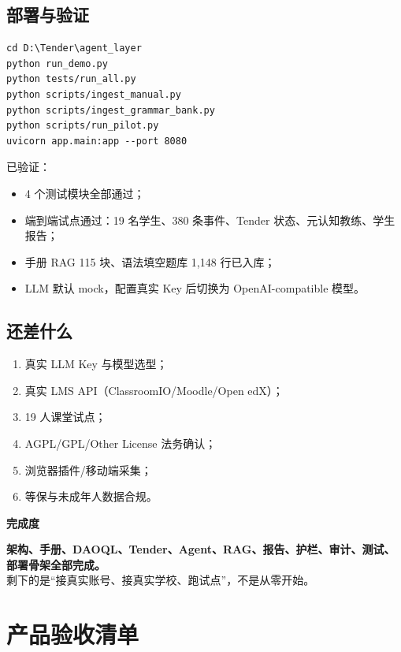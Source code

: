 \documentclass[UTF8,a4paper,11pt]{ctexart}
\newenvironment{explainbox}[1]
{\begin{center}\begin{minipage}{0.94\textwidth}\colorbox{boxbg}{\parbox{0.92\textwidth}{\textbf{#1}\par\vspace{2pt}}}}
{\end{minipage}\end{center}}
\begin{document}
\subsection{部署与验证}

\begin{verbatim}
cd D:\Tender\agent_layer
python run_demo.py
python tests/run_all.py
python scripts/ingest_manual.py
python scripts/ingest_grammar_bank.py
python scripts/run_pilot.py
uvicorn app.main:app --port 8080
\end{verbatim}

已验证：

\begin{itemize}[leftmargin=2em]
\item 4 个测试模块全部通过；
\item 端到端试点通过：19 名学生、380 条事件、Tender 状态、元认知教练、学生报告；
\item 手册 RAG 115 块、语法填空题库 1{,}148 行已入库；
\item LLM 默认 mock，配置真实 Key 后切换为 OpenAI-compatible 模型。
\end{itemize}

\subsection{还差什么}

\begin{enumerate}[leftmargin=2em]
\item 真实 LLM Key 与模型选型；
\item 真实 LMS API（ClassroomIO/Moodle/Open edX）；
\item 19 人课堂试点；
\item AGPL/GPL/Other License 法务确认；
\item 浏览器插件/移动端采集；
\item 等保与未成年人数据合规。
\end{enumerate}

\begin{explainbox}{完成度}
\textbf{架构、手册、DAOQL、Tender、Agent、RAG、报告、护栏、审计、测试、部署骨架全部完成。}\\
剩下的是“接真实账号、接真实学校、跑试点”，不是从零开始。
\end{explainbox}


\section{产品验收清单}
\end{document}
